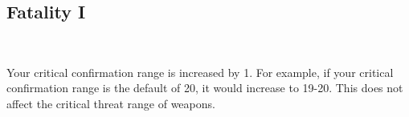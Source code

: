 \subsection*{Fatality I}\label{feat:fatality1}
 \\

Your critical confirmation range is increased by 1. For example, if your
critical confirmation range is the default of 20, it would increase to 19-20.
This does not affect the critical threat range of weapons.

